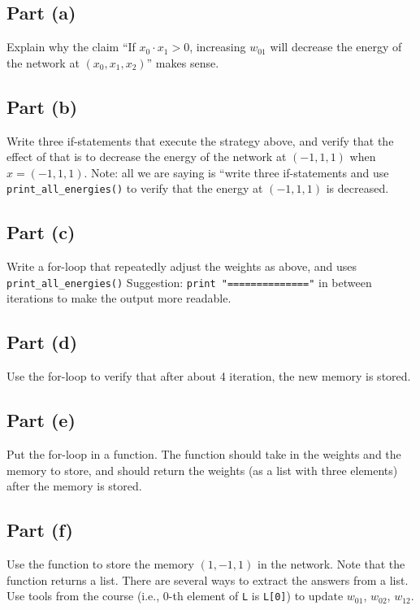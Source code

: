 \documentclass[11pt]{article}
\begin{document}
\subsection*{Part (a)}
Explain why the claim ``If $x_0 \cdot x_1 > 0$, increasing $w_{01}$ will decrease the energy of the network at $(x_0, x_1, x_2)$'' makes sense.

\subsection*{Part (b)}
Write three if-statements that execute the strategy above, and verify that the effect of that is to decrease the energy of the network at $(-1, 1, 1)$ when $x = (-1, 1, 1)$. Note: all we are saying is ``write three if-statements and use \texttt{print\_all\_energies()} to verify that the energy at $(-1, 1, 1)$ is decreased.

\subsection*{Part (c)}
Write a for-loop that repeatedly adjust the weights as above, and uses \texttt{print\_all\_energies()} Suggestion: \texttt{print "=============="} in between iterations to make the output more readable.

\subsection*{Part (d)}
Use the for-loop to verify that after about 4 iteration, the new memory is stored.

\subsection*{Part (e)}
Put the for-loop in a function. The function should take in the weights and the memory to store, and should return the weights (as a list with three elements) after the memory is stored.

\subsection*{Part (f)}
Use the function to store the memory $(1, -1, 1)$ in the network. Note that the function returns a list. There are several ways to extract the answers from a list. Use tools from the course (i.e., 0-th element of \texttt{L} is \texttt{L[0]}) to update $w_{01}$, $w_{02}$, $w_{12}$.
\end{document}
